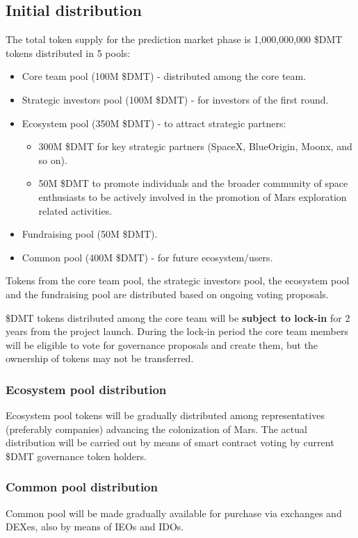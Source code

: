 \documentclass[12pt]{article}
\begin{document}
\subsection{Initial distribution}
The total token supply for the prediction market phase is 1,000,000,000 \$DMT tokens distributed in 5 pools:
\begin{itemize}
\item{Core team pool (100M \$DMT)} - distributed among the core team.
\item{Strategic investors pool (100M \$DMT)} - for investors of the first round.
\item{Ecosystem pool (350M \$DMT)} - to attract strategic partners:
	\begin{itemize}
	\item{300M \$DMT} for key strategic partners (SpaceX, BlueOrigin, Moonx, and so on).
	\item{50M \$DMT} to promote individuals and the broader community of space enthusiasts to be actively involved in the promotion of Mars exploration related activities.
	\end{itemize}
\item{Fundraising pool (50M \$DMT).}
\item{Common pool (400M \$DMT)} - for future ecosystem/users.
\end{itemize}

Tokens from the core team pool, the strategic investors pool, the ecosystem pool and the fundraising pool are distributed based on ongoing voting proposals.

\$DMT tokens distributed among the core team will be \textbf{subject to lock-in} for 2 years from the project launch. During the lock-in period the core team members will be eligible to vote for governance proposals and create them, but the ownership of tokens may not be transferred.

\subsubsection{Ecosystem pool distribution}
Ecosystem pool tokens will be gradually distributed among representatives (preferably companies) advancing the colonization of Mars. The actual distribution will be carried out by means of smart contract voting by current \$DMT governance token holders.

\subsubsection{Common pool distribution}
Common pool will be made gradually available for purchase via exchanges and DEXes, also by means of IEOs and IDOs.
\end{document}

